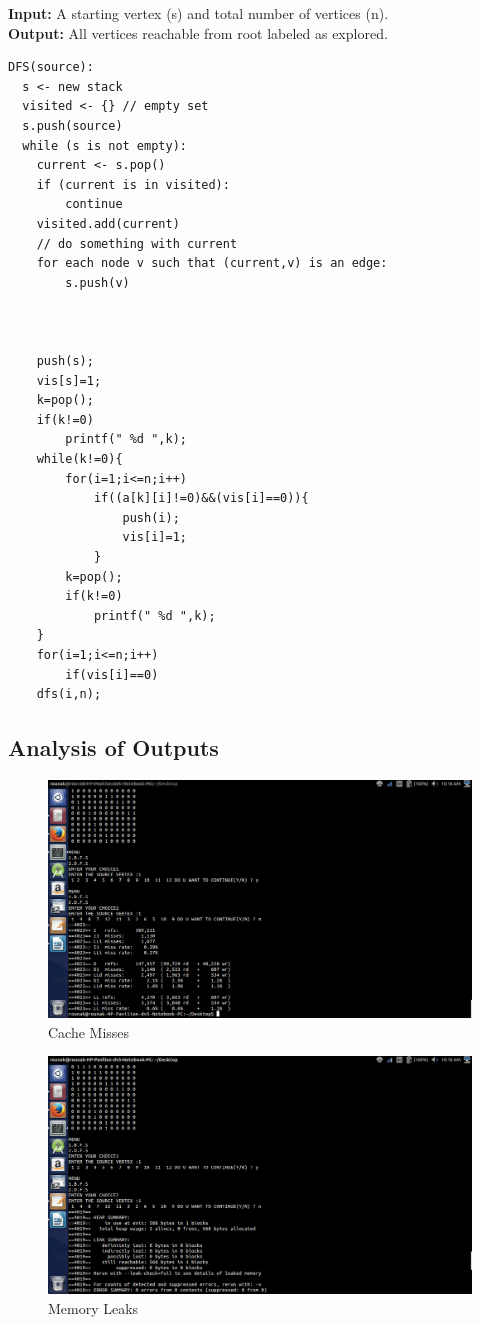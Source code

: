 \documentclass[11pt]{article}%
\begin{document}
\hspace*{1.35cm}\textbf{Input:} A starting vertex (s) and total number of vertices (n).\\
\hspace*{1.35cm}\textbf{Output:} All vertices reachable from root labeled as explored.\\

\begin{lstlisting}
DFS(source):
  s <- new stack
  visited <- {} // empty set
  s.push(source)
  while (s is not empty):
    current <- s.pop()
    if (current is in visited):
        continue
    visited.add(current)
    // do something with current
    for each node v such that (current,v) is an edge:
        s.push(v)



	push(s);
	vis[s]=1;
	k=pop();
	if(k!=0)	
		printf(" %d ",k);
	while(k!=0){
		for(i=1;i<=n;i++)
			if((a[k][i]!=0)&&(vis[i]==0)){
				push(i);
				vis[i]=1;
			}
		k=pop();
		if(k!=0)
			printf(" %d ",k);
	}
	for(i=1;i<=n;i++)
		if(vis[i]==0)
	dfs(i,n);

\end{lstlisting}

\subsection{Analysis of Outputs}
\begin{figure}[h!]
\center
\includegraphics[width = 16cm]{project_1}
\caption{Cache Misses}
\end{figure}

\begin{figure}[h!]
\center
\includegraphics[width = 16cm]{project_2}
\caption{Memory Leaks}
\end{figure}
\end{document}

